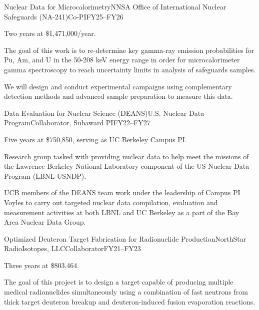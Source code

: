 \begin{rSubsection}{Nuclear Data for Microcalorimetry}{\textnormal{NNSA Office of International Nuclear Safeguards (NA-241)}}{Co-PI}{FY25--FY26}
\item    Two years at \$1,471,000/year.
\item The goal of this work is to re-determine key gamma-ray emission probabilities for Pu, Am, and U in the 50-208 keV energy range in order for microcalorimeter gamma spectroscopy to reach uncertainty limits in analysis of safeguards samples.
\item We will design and conduct experimental campaigns using complementary detection methods and advanced sample preparation to measure this data.


\end{rSubsection}

\begin{rSubsection}{Data Evaluation for Nuclear Science (DEANS)}{\textnormal{U.S. Nuclear Data Program}}{Collaborator, Subaward PI}{FY22--FY27}
\item    Five years at \$750,850, serving as UC Berkeley Campus PI.
\item Research group tasked with providing nuclear data to help meet the missions of the Lawrence Berkeley National Laboratory component of the US Nuclear Data Program (LBNL-USNDP). 
\item UCB members of the DEANS team work under the leadership of Campus PI Voyles to carry out targeted nuclear
data compilation, evaluation and measurement activities at both LBNL and UC Berkeley as a part of the Bay Area Nuclear Data Group. 


\end{rSubsection}



\begin{rSubsection}{Optimized Deuteron Target Fabrication for Radionuclide Production}{\textnormal{NorthStar RadioIsotopes, LLC}}{Collaborator}{FY21--FY23}
\item    Three years at \$803,464.
\item The goal of this project is to design a target capable of producing multiple medical radionuclides simultaneously using a combination of fast neutrons from thick target deuteron breakup and deuteron-induced fusion evaporation reactions.

\end{rSubsection}

